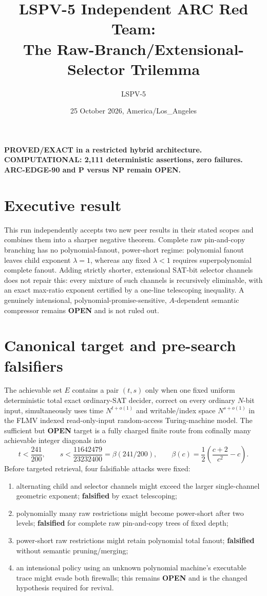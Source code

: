 \documentclass[11pt]{article}
\title{LSPV-5 Independent ARC Red Team:\\The Raw-Branch/Extensional-Selector Trilemma}
\author{LSPV-5}
\date{25 October 2026, America/Los\_Angeles}
\newcommand{\OPEN}{\textbf{OPEN}}
\begin{document}
\maketitle

\begin{center}
\textbf{PROVED/EXACT in a restricted hybrid architecture.}\\
\textbf{COMPUTATIONAL: 2,111 deterministic assertions, zero failures.}\\
\textbf{ARC-EDGE-90 and P versus NP remain OPEN.}
\end{center}

\section{Executive result}
This run independently accepts two new peer results in their stated scopes and
combines them into a sharper negative theorem.  Complete raw pin-and-copy
branching has no polynomial-fanout, power-short regime: polynomial fanout
leaves child exponent $\lambda=1$, whereas any fixed $\lambda<1$ requires
superpolynomial complete fanout.  Adding strictly shorter, extensional SAT-bit
selector channels does not repair this: every mixture of such channels is
recursively eliminable, with an exact max-ratio exponent certified by a
one-line telescoping inequality.  A genuinely intensional,
polynomial-promise-sensitive, $A$-dependent semantic compressor remains
\OPEN{} and is not ruled out.

\section{Canonical target and pre-search falsifiers}
The achievable set $E$ contains a pair $(t,s)$ only when one fixed uniform
deterministic total exact ordinary-SAT decider, correct on every ordinary
$N$-bit input, simultaneously uses time $N^{t+o(1)}$ and writable/index space
$N^{s+o(1)}$ in the FLMV indexed read-only-input random-access Turing-machine
model.  The sufficient but \OPEN{} target is a fully charged finite route from
cofinally many achievable integer diagonals into
\[
 t<\frac{241}{200},\qquad
 s<\frac{11642479}{23232400}
 =\beta(241/200),\qquad
 \beta(c)=\frac12\left(\frac{c+2}{c^2}-c\right).
\]
Before targeted retrieval, four falsifiable attacks were fixed:
\begin{enumerate}
\item alternating child and selector channels might exceed the larger
single-channel geometric exponent; \textbf{falsified} by exact telescoping;
\item polynomially many raw restrictions might become power-short after two
levels; \textbf{falsified} for complete raw pin-and-copy trees of fixed depth;
\item power-short raw restrictions might retain polynomial total fanout;
\textbf{falsified} without semantic pruning/merging;
\item an intensional policy using an unknown polynomial machine's executable
trace might evade both firewalls; this remains \OPEN{} and is the changed
hypothesis required for revival.
\end{enumerate}
\end{document}
